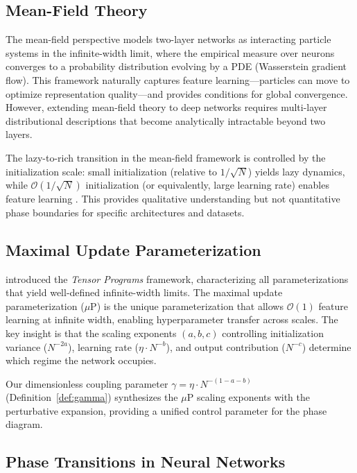 \documentclass[11pt]{article}
\theoremstyle{definition}
\newcommand{\cO}{\mathcal{O}}
\newcommand{\muP}{\mu\text{P}}
\begin{document}
\subsection{Mean-Field Theory}

The mean-field perspective \citep{mei2018mean,rotskoff2018parameters,chizat2018global} models two-layer networks as interacting particle systems in the infinite-width limit, where the empirical measure over neurons converges to a probability distribution evolving by a PDE (Wasserstein gradient flow). This framework naturally captures feature learning---particles can move to optimize representation quality---and provides conditions for global convergence. However, extending mean-field theory to deep networks requires multi-layer distributional descriptions that become analytically intractable beyond two layers.

The lazy-to-rich transition in the mean-field framework is controlled by the initialization scale: small initialization (relative to $1/\sqrt{N}$) yields lazy dynamics, while $\cO(1/\sqrt{N})$ initialization (or equivalently, large learning rate) enables feature learning \citep{chizat2019lazy}. This provides qualitative understanding but not quantitative phase boundaries for specific architectures and datasets.

\subsection{Maximal Update Parameterization}

\citet{yang2021tensor} introduced the \emph{Tensor Programs} framework, characterizing all parameterizations that yield well-defined infinite-width limits. The maximal update parameterization ($\muP$) is the unique parameterization that allows $\cO(1)$ feature learning at infinite width, enabling hyperparameter transfer across scales. The key insight is that the scaling exponents $(a, b, c)$ controlling initialization variance ($N^{-2a}$), learning rate ($\eta \cdot N^{-b}$), and output contribution ($N^{-c}$) determine which regime the network occupies.

Our dimensionless coupling parameter $\gamma = \eta \cdot N^{-(1-a-b)}$ (Definition~\ref{def:gamma}) synthesizes the $\muP$ scaling exponents with the perturbative expansion, providing a unified control parameter for the phase diagram.

\subsection{Phase Transitions in Neural Networks}
\end{document}
